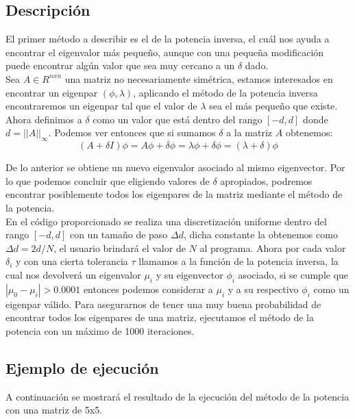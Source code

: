 \documentclass[12pt]{article}
\begin{document}
\subsection{Descripción}
El primer método a describir es el de la potencia inversa, el cuál nos ayuda a encontrar el eigenvalor más pequeño, aunque con una pequeña modificación puede encontrar algún valor que sea muy cercano a un $\delta$ dado.\\
Sea $A \in R^{nxn}$ una matriz no necesariamente simétrica, estamos interesados en encontrar un eigenpar $(\phi, \lambda)$, aplicando el método de la potencia inversa encontraremos un eigenpar tal que el valor de $\lambda$ sea el más pequeño que existe. Ahora definimos a $\delta$ como un valor que está dentro del rango $[-d, d]$ donde $d = ||A||_{\infty}$. Podemos ver entonces que si sumamos $\delta$ a la matriz $A$ obtenemos:\\
$$(A + \delta I)\phi = A\phi + \delta \phi = \lambda \phi + \delta \phi = (\lambda + \delta)\phi$$

De lo anterior se obtiene un nuevo eigenvalor asociado al mismo eigenvector. Por lo que podemos concluir que eligiendo valores de $\delta$ apropiados, podremos encontrar posiblemente todos los eigenpares de la matriz mediante el método de la potencia.\\
En el código proporcionado se realiza una discretización uniforme dentro del rango $[-d, d]$ con un tamaño de paso $\Delta d$, dicha constante la obtenemos como $\Delta d = 2d / N$, el usuario brindará el valor de $N$ al programa. Ahora por cada valor $\delta_i$ y con una cierta tolerancia $\tau$ llamamos a la función de la potencia inversa, la cual nos devolverá un eigenvalor $\mu_i$ y su eigenvector $\phi_i$ asociado, si se cumple que $|\mu_0 - \mu_i| > 0.0001$ entonces podemos considerar a $\mu_i$ y a su respectivo $\phi_i$ como un eigenpar válido. Para asegurarnos de tener una muy buena probabilidad de encontrar todos los eigenpares de una matriz, ejecutamos el método de la potencia con un máximo de 1000 iteraciones.

\subsection{Ejemplo de ejecución}
A continuación se mostrará el resultado de la ejecución del método de la potencia con una matriz de 5x5.\\
\end{document}

